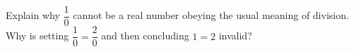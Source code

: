 Explain why $\dfrac{1}{0}$ cannot be a real number obeying the usual meaning of division. Why is setting $\dfrac{1}{0}=\dfrac{2}{0}$ and then concluding $1=2$ invalid?
